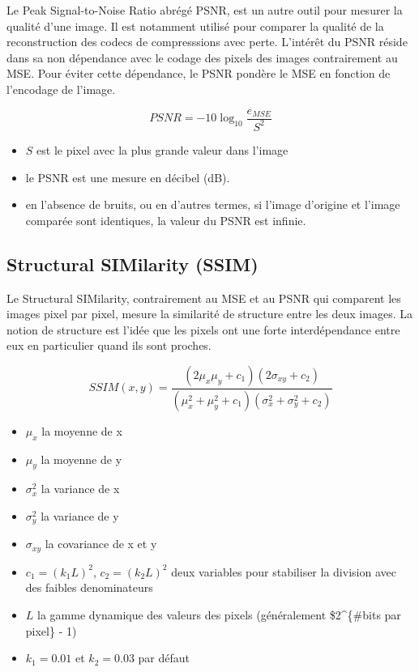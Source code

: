 \documentclass[]{article}
\providecommand{\tightlist}{%
  \setlength{\itemsep}{0pt}\setlength{\parskip}{0pt}}
\begin{document}
Le Peak Signal-to-Noise Ratio abrégé PSNR, est un autre outil pour
mesurer la qualité d'une image. Il est notamment utilisé pour comparer
la qualité de la reconstruction des codecs de compresssions avec perte.
L'intérêt du PSNR réside dans sa non dépendance avec le codage des
pixels des images contrairement au MSE. Pour éviter cette dépendance, le
PSNR pondère le MSE en fonction de l'encodage de l'image.

\[PSNR = -10\log_{10}\frac{e_{MSE}}{S^2}\]

\begin{itemize}
\tightlist
\item
  \(S\) est le pixel avec la plus grande valeur dans l'image
\item
  le PSNR est une mesure en décibel (dB).
\item
  en l'absence de bruits, ou en d'autres termes, si l'image d'origine et
  l'image comparée sont identiques, la valeur du PSNR est infinie.
\end{itemize}

\hypertarget{structural-similarity-ssim}{%
\subsection{Structural SIMilarity
(SSIM)}\label{structural-similarity-ssim}}

Le Structural SIMilarity, contrairement au MSE et au PSNR qui comparent
les images pixel par pixel, mesure la similarité de structure entre les
deux images. La notion de structure est l'idée que les pixels ont une
forte interdépendance entre eux en particulier quand ils sont proches.

\[SSIM(x, y) = \frac{(2\mu_x\mu_y + c_1)(2\sigma_{xy}+ c_2)}{(\mu^2_x + \mu^2_y + c_1)(\sigma^2_x + \sigma^2_y + c_2)}\]

\begin{itemize}
\tightlist
\item
  \(\mu_{x}\) la moyenne de x
\item
  \(\mu_{y}\) la moyenne de y
\item
  \(\sigma^2_{x}\) la variance de x
\item
  \(\sigma^2_{y}\) la variance de y
\item
  \(\sigma_{xy}\) la covariance de x et y
\item
  \(c_{1}=(k_{1}L)^2\), \(c_{2}=(k_{2}L)^2\) deux variables pour
  stabiliser la division avec des faibles denominateurs
\item
  \(L\) la gamme dynamique des valeurs des pixels (généralement
  \$2\^{}\{\#bits par pixel\} - 1)
\item
  \(k_1=0.01\) et \(k_2=0.03\) par défaut
\end{itemize}
\end{document}
